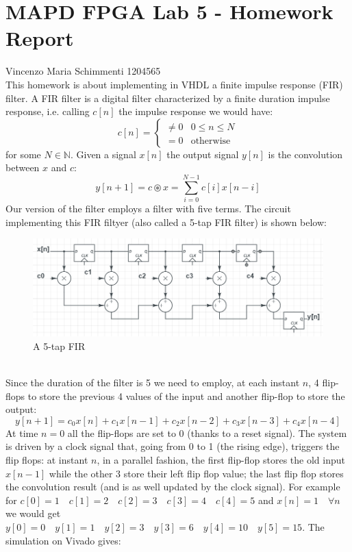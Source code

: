\documentclass[a4paper,12pt]{article}
\begin{document}
\section*{MAPD FPGA Lab 5 - Homework Report}
Vincenzo Maria Schimmenti 1204565\\
This homework is about implementing in VHDL a finite impulse response (FIR) filter. A FIR filter is a digital filter characterized by a finite duration impulse response, i.e. calling $c[n]$ the impulse response we would have:
$$c[n]=\begin{cases}
\neq 0 & 0 \leq n \leq N \\
= 0 & \textrm{otherwise}
\end{cases}$$
for some $N \in \mathbb{N}$. Given a signal $x[n]$ the output signal $y[n]$ is the convolution between $x$ and $c$:
$$y[n+1]=c \circledast x = \sum_{i=0}^{N-1} c[i]x[n-i]$$
Our version of the filter employs a filter with five terms. The circuit implementing this FIR filtyer (also called a 5-tap FIR filter) is shown below:\\
\begin{figure}[h!]
	\includegraphics[width=\linewidth]{fir5.png}
	\caption{A 5-tap FIR}
	\label{fig:fir5}
\end{figure}\\
Since the duration of the filter is 5 we need to employ, at each instant $n$, 4 flip-flops to store the previous 4 values of the input and another flip-flop to store the output:
$$y[n+1]=c_0 x[n] + c_1x[n-1]+c_2x[n-2]+c_3x[n-3] + c_4x[n-4]$$
At time $n=0$ all the flip-flops are set to $0$ (thanks to a reset signal). The system is driven by a clock signal that, going from 0 to 1 (the rising edge), triggers the flip flops: at instant $n$, in a parallel fashion, the first flip-flop stores the old input $x[n-1]$ while the other 3 store their left flip flop value; the last flip flop stores the convolution result (and is as well updated by the clock signal).
\newpage For example for $c[0]=1 \quad c[1]=2 \quad c[2]=3 \quad c[3]=4 \quad c[4]=5$ and $x[n]=1 \quad \forall n$ we would get $y[0]=0\quad y[1]=1 \quad y[2] =3 \quad y[3] = 6 \quad y[4] = 10 \quad y[5]=15$. The simulation on Vivado gives:
\end{document}
